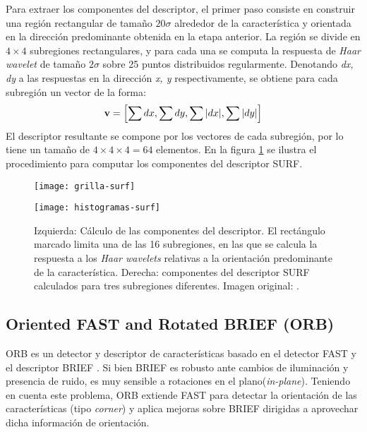 Para extraer los componentes del descriptor, el primer paso consiste en construir una región rectangular de tamaño $20\sigma$ alrededor de la característica y orientada en la dirección predominante obtenida en la etapa anterior. La región se divide en $4 \times 4$ subregiones rectangulares, y para cada una se computa la respuesta de \textit{Haar wavelet} de tamaño $2\sigma$ sobre 25 puntos distribuidos regularmente. Denotando \textit{dx, dy} a las respuestas en la dirección \textit{x, y} respectivamente, se obtiene para cada subregión un vector de la forma:
\begin{equation}
\textbf{v} = \left[\sum{dx}, \sum{dy}, \sum{\lvert dx\rvert}, \sum{\lvert dy\rvert}\right]
\end{equation}
El descriptor resultante se compone por los vectores de cada subregión, por lo tiene un tamaño de $ 4 \times 4 \times 4 = 64 $ elementos. En la figura \ref{fig:componentes-descriptor-surf} se ilustra el procedimiento para computar los componentes del descriptor SURF.

\begin{figure}[ht]
\centering
\begin{minipage}[h]{.45\textwidth}
\begin{center}
\texttt{[image: grilla-surf]}
\end{center}
\end{minipage}
\hfill
\begin{minipage}[h]{.45\textwidth}
\begin{center}
\texttt{[image: histogramas-surf]}
\end{center}
\end{minipage}
\hfill
\caption[Componentes del descriptor SURF]
{Izquierda: Cálculo de las componentes del descriptor. El rectángulo marcado limita una de las 16 subregiones, en las que se calcula la respuesta a los \textit{Haar wavelets} relativas a la orientación predominante de la característica. Derecha: componentes del descriptor SURF calculados para tres subregiones diferentes. Imagen original: \cite{bay2008speeded}.}
\label{fig:componentes-descriptor-surf}
\end{figure}

\subsection{Oriented FAST and Rotated BRIEF (ORB)}

ORB \cite{RubleeRKB11} es un detector y descriptor de características basado en el detector FAST \cite{Rosten06machinelearning} y el descriptor BRIEF \cite{Calonder12}. Si bien BRIEF es robusto ante cambios de iluminación y presencia de ruido, es muy sensible a rotaciones en el plano(\textit{in-plane}). Teniendo en cuenta este problema, ORB extiende FAST para detectar la orientación de las características (tipo \textit{corner}) y aplica mejoras sobre BRIEF dirigidas a aprovechar dicha información de orientación.

